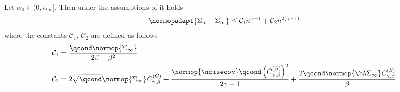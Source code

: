 \begin{lemma}
\label{lem:sigma_n_bound}
    Let $\alpha_0 \in (0, \alpha_{\infty}]$. Then under the assumptions of {} it holds
    \begin{align}
        \label{bound:norm_of_bL_minus_Lstar}
        \normopadapt{\Sigma_n - \Sigma_{\infty}} \leq \mathcal{C}_1 n^{\gamma-1} + {\mathcal{C}}_2 n^{2(\gamma-1)}
    \end{align}
    where the constants $\mathcal{C}_1$, $\mathcal{C}_2$ are defined as follows
    \begin{align}
        \label{lemma:constants definition}
        &\mathcal{C}_1 = \frac{\qcond \normop{\Sigma_{\infty}}}{2\beta - \beta^2} 
        \\
         &\mathcal{C}_2 = 2\sqrt{\qcond} \normop{\Sigma_{\infty}} C_{\gamma, \beta}^{(G)} + \frac{\normop{\noisecov} \qcond \left(C_{\gamma, \beta}^{(S)}\right)^2}{2\gamma-1} + \frac{2 \qcond \normop{\bA \Sigma_{\infty}} C_{\gamma, \beta}^{(S)}}{\beta} 
    \end{align}
\end{lemma}
